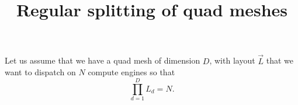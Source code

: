 \documentclass[aps]{revtex4}
\begin{document}
\title{Regular splitting of quad meshes}
\maketitle

Let us assume that we have a quad mesh of dimension $D$,
with layout $\vec{L}$ that we want to dispatch
on $N$ compute engines so that
$$
	\prod_{d=1}^{D} L_d = N.
$$
\end{document}
